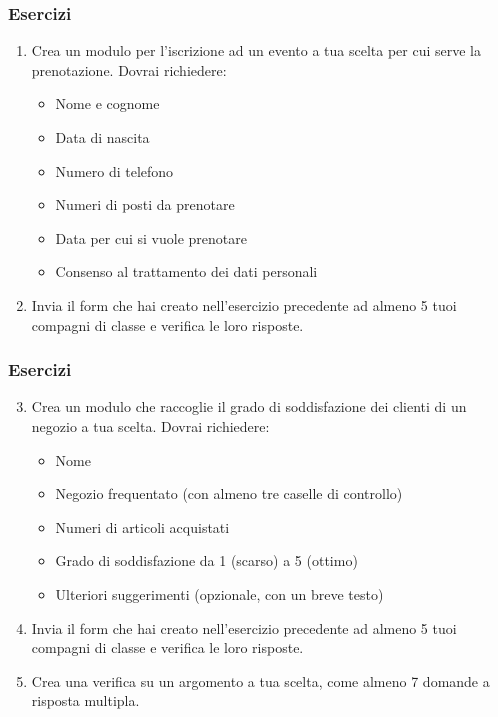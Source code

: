 \documentclass[]{beamer}
\begin{document}
\begin{frame}
\frametitle{Esercizi}
\begin{enumerate}
  \item Crea un modulo per l'iscrizione ad un evento a tua scelta per cui serve la prenotazione. Dovrai richiedere:
  \begin{itemize}
    \item Nome e cognome
    \item Data di nascita
    \item Numero di telefono
    \item Numeri di posti da prenotare
    \item Data per cui si vuole prenotare
    \item Consenso al trattamento dei dati personali
  \end{itemize}
  \item Invia il form che hai creato nell'esercizio precedente ad almeno 5 tuoi compagni di classe e verifica le loro risposte.
\end{enumerate}
\end{frame}






\begin{frame}
\frametitle{Esercizi}
\begin{enumerate}\setcounter{enumi}{2}
  \item Crea un modulo che raccoglie il grado di soddisfazione dei clienti di un negozio a tua scelta. Dovrai richiedere:
  \begin{itemize}
    \item Nome
    \item Negozio frequentato (con almeno tre caselle di controllo)
    \item Numeri di articoli acquistati
    \item Grado di soddisfazione da 1 (scarso) a 5 (ottimo)
    \item Ulteriori suggerimenti (opzionale, con un breve testo)
  \end{itemize}
  \item Invia il form che hai creato nell'esercizio precedente ad almeno 5 tuoi compagni di classe e verifica le loro risposte.
  \item Crea una verifica su un argomento a tua scelta, come almeno 7 domande a risposta multipla.
\end{enumerate}
\end{frame}
\end{document}
